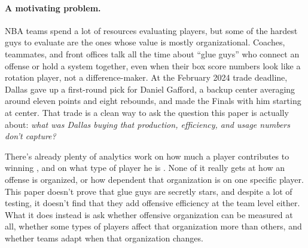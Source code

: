 \documentclass[11pt]{article}
\begin{document}
\paragraph{A motivating problem.}
NBA teams spend a lot of resources evaluating players, but some of the hardest guys to
evaluate are the ones whose value is mostly organizational. Coaches, teammates, and front
offices talk all the time about ``glue guys'' who connect an offense or hold a system
together, even when their box score numbers look like a rotation player, not a
difference-maker. At the February 2024 trade deadline, Dallas gave up a first-round pick for
Daniel Gafford, a backup center averaging around eleven points and eight rebounds, and made
the Finals with him starting at center. That trade is a clean way to ask the question this
paper is actually about: \emph{what was Dallas buying that production, efficiency, and usage
numbers don't capture?}

There's already plenty of analytics work on how much a player contributes to winning
\citep{rosenbaum2004apm, sill2010winval}, and on what type of player he is
\citep{lutz2012cluster, alagappan2012positions}. None of it really gets at how an offense is
organized, or how dependent that organization is on one specific player. This paper doesn't
prove that glue guys are secretly stars, and despite a lot of testing, it doesn't find that
they add offensive efficiency at the team level either. What it does instead is ask whether
offensive organization can be measured at all, whether some types of players affect that
organization more than others, and whether teams adapt when that organization changes.
\end{document}
